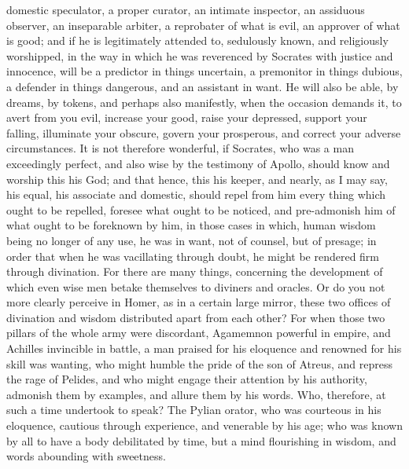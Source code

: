 \documentclass[12pt]{article}
\begin{document}
domestic speculator, a proper curator, an intimate inspector, an assiduous
observer, an inseparable arbiter, a reprobater of what is evil, an approver of
what is good; and if he is legitimately attended to, sedulously known, and
religiously worshipped, in the way in which he was reverenced by Socrates with
justice and innocence, will be a predictor in things uncertain, a premonitor in
things dubious, a defender in things dangerous, and an assistant in want.  He
will also be able, by dreams, by tokens, and perhaps also manifestly, when the
occasion demands it, to avert from you evil, increase your good, raise your
depressed, support your falling, illuminate your obscure, govern your
prosperous, and correct your adverse circumstances. It is not therefore
wonderful, if Socrates, who was a man exceedingly perfect, and also wise by the
testimony of Apollo, should know and worship this his God; and that hence, this
his keeper, and nearly, as I may say, his equal, his associate and domestic,
should repel from him every thing which ought to be repelled, foresee what
ought to be noticed, and pre-admonish him of what ought to be foreknown by him,
in those cases in which, human wisdom being no longer of any use, he was in
want, not of counsel, but of presage; in order that when he was vacillating
through doubt, he might be rendered firm through divination.  For there are
many things, concerning the development of which even wise men betake
themselves to diviners and oracles. Or do you not more clearly perceive in
Homer, as in a certain large mirror, these two offices of divination and wisdom
distributed apart from each other?  For when those two pillars of the whole
army were discordant, Agamemnon powerful in empire, and Achilles invincible in
battle, a man praised for his eloquence and renowned for his skill was wanting,
who might humble the pride of the son of Atreus, and repress the rage of
Pelides, and who might engage their attention by his authority, admonish them
by examples, and allure them by his words.  Who, therefore, at such a time
undertook to speak? The Pylian orator, who was courteous in his eloquence,
cautious through experience, and venerable by his age; who was known by all to
have a body debilitated by time, but a mind flourishing in wisdom, and words
abounding with sweetness.
\end{document}
